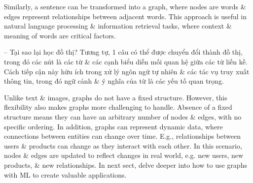 \documentclass{article}
\begin{document}
\begin{itemize}
\begin{itemize}
        Similarly, a sentence can be transformed into a graph, where nodes are words \& edges represent relationships between adjacent words. This approach is useful in natural language processing \& information retrieval tasks, where context \& meaning of words are critical factors.

        -- {\sf Tại sao lại học đồ thị?} Tương tự, 1 câu có thể được chuyển đổi thành đồ thị, trong đó các nút là các từ \& các cạnh biểu diễn mối quan hệ giữa các từ liền kề. Cách tiếp cận này hữu ích trong xử lý ngôn ngữ tự nhiên \& các tác vụ truy xuất thông tin, trong đó ngữ cảnh \& ý nghĩa của từ là các yếu tố quan trọng.

        Unlike text \& images, graphs do not have a fixed structure. However, this flexibility also makes graphs more challenging to handle. Absence of a fixed structure means they can have an arbitrary number of nodes \& edges, with no specific ordering. In addition, graphs can represent dynamic data, where connections between entities can change over time. E.g., relationships between users \& products can change as they interact with each other. In this scenario, nodes \& edges are updated to reflect changes in real world, e.g. new users, new products, \& new relationships. In next sect, delve deeper into how to use graphs with ML to create valuable applications.


\end{itemize}
\end{itemize}
\end{document}
